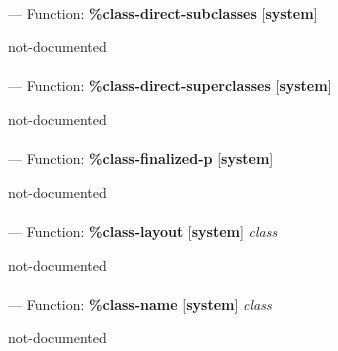 \paragraph{}
\label{SYSTEM:CLASS-DIRECT-SUBCLASSES}
--- Function: \textbf{\%class-direct-subclasses} [\textbf{system}] \textit{}

\begin{adjustwidth}{5em}{5em}
not-documented
\end{adjustwidth}

\paragraph{}
\label{SYSTEM:CLASS-DIRECT-SUPERCLASSES}
--- Function: \textbf{\%class-direct-superclasses} [\textbf{system}] \textit{}

\begin{adjustwidth}{5em}{5em}
not-documented
\end{adjustwidth}

\paragraph{}
\label{SYSTEM:CLASS-FINALIZED-P}
--- Function: \textbf{\%class-finalized-p} [\textbf{system}] \textit{}

\begin{adjustwidth}{5em}{5em}
not-documented
\end{adjustwidth}

\paragraph{}
\label{SYSTEM:CLASS-LAYOUT}
--- Function: \textbf{\%class-layout} [\textbf{system}] \textit{class}

\begin{adjustwidth}{5em}{5em}
not-documented
\end{adjustwidth}

\paragraph{}
\label{SYSTEM:CLASS-NAME}
--- Function: \textbf{\%class-name} [\textbf{system}] \textit{class}

\begin{adjustwidth}{5em}{5em}
not-documented
\end{adjustwidth}

